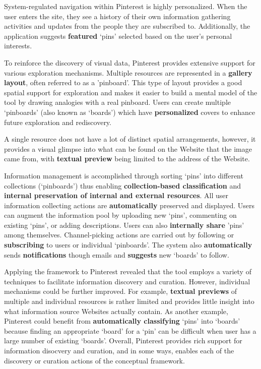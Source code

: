 \documentclass{sigchi}
\begin{document}
{{System-regulated navigation within Pinterest is highly personalized. When the user enters the site, they see a history of their own information gathering activities and updates from the people they are subscribed to. Additionally, the application suggests \textbf{featured} `pins' selected based on the user's personal interests.

To reinforce the discovery of visual data, Pinterest provides extensive support for various exploration mechanisms. Multiple resources are represented in a \textbf{gallery layout}, often referred to as a 'pinboard'. This type of layout provides a good spatial support for exploration and makes it easier to build a mental model of the tool by drawing analogies with a real pinboard. Users can create multiple `pinboards' (also known as `boards') which have \textbf{personalized} covers to enhance future exploration and rediscovery.

A single resource does not have a lot of distinct spatial arrangements, however, it provides a visual glimpse into what can be found on the Website that the image came from, with \textbf{textual preview} being limited to the address of the Website. 

Information management is accomplished through sorting `pins' into different collections (`pinboards') thus enabling \textbf{collection-based classification} and \textbf{internal preservation of internal and external resources}. All user information collecting actions are \textbf{automatically} preserved and displayed. Users can augment the information pool by uploading new `pins', commenting on existing `pins', or adding descriptions. Users can also \textbf{internally share} 'pins' among themselves. Channel-picking actions are carried out by following or \textbf{subscribing} to users or individual `pinboards'. The system also \textbf{automatically} sends \textbf{notifications} though emails and \textbf{suggests} new `boards' to follow.

Applying the framework to Pinterest revealed that the tool employs a  variety of techniques to facilitate information discovery and curation. However, individual mechanisms could be further improved. For example, \textbf{textual previews} of multiple and individual resources is rather limited and provides little insight into what information source Websites actually contain. As another example, Pinterest could benefit from \textbf{automatically classifying} `pins' into `boards' because finding an appropriate `board' for a `pin' can be difficult when user has a large number of existing `boards'. Overall, Pinterest provides rich support for information disocvery and curation, and in some ways, enables each of the discovery or curation actions of the conceptual framework. 
} %


}
\end{document}
